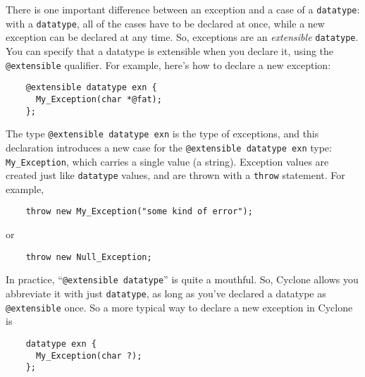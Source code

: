 There is one important difference between an exception and a case of a
\texttt{datatype}: with a \texttt{datatype}, all of the cases have to be
declared at once, while a new exception can be declared at any time.
So, exceptions are an \emph{extensible} \texttt{datatype}.  You can
specify that a datatype is extensible when you declare it, using the
\texttt{@extensible} qualifier.  For example, 
here's how to declare a new exception:
\begin{verbatim}
    @extensible datatype exn {
      My_Exception(char *@fat);
    };
\end{verbatim}
The type \texttt{@extensible datatype exn} is the type of exceptions,
and this declaration introduces a new case for the \texttt{@extensible
datatype exn} type: \texttt{My_Exception}, which carries a single
value (a string).  Exception values are created just like
\texttt{datatype} values, and are thrown with a \texttt{throw}
statement.  For example,
\begin{verbatim}
    throw new My_Exception("some kind of error");
\end{verbatim}
or
\begin{verbatim}
    throw new Null_Exception;
\end{verbatim}

In practice, ``\texttt{@extensible datatype}'' is quite a mouthful.
So, Cyclone allows you abbreviate it with just \texttt{datatype},
as long as you've declared a datatype as \texttt{@extensible} once.
So a more typical way to declare a new exception in Cyclone is
\begin{verbatim}
    datatype exn {
      My_Exception(char ?);
    };
\end{verbatim}

